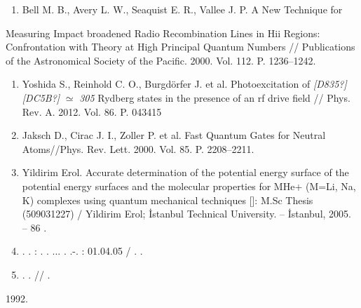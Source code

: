 \documentclass[a4paper]{article}
\newcounter{saveenum}
\newcommand\liststyleWWNumi{%
\renewcommand\theenumi{\arabic{enumi}}
\renewcommand\theenumii{\Roman{enumii}}
\renewcommand\theenumiii{\roman{enumiii}}
\renewcommand\theenumiv{\arabic{enumiv}}
\renewcommand\labelenumi{\theenumi.}
\renewcommand\labelenumii{\theenumii.}
\renewcommand\labelenumiii{\theenumiii.}
\renewcommand\labelenumiv{\theenumiv.}
}
\begin{document}
\begin{enumerate}
\item \foreignlanguage{english}{Bell M. B., Avery L. W., Seaquist E. R., Vallee J. P. A New Technique for}
\end{enumerate}
\foreignlanguage{english}{Measuring Impact broadened Radio Recombination Lines in Hii Regions: Confrontation with Theory
at High Principal Quantum Numbers // Publications of the Astronomical Society of the Pacific. 2000. Vol. 112. P.
1236--1242.}

\liststyleWWNumi
\setcounter{saveenum}{\value{enumi}}
\begin{enumerate}
\setcounter{enumi}{\value{saveenum}}
\item \foreignlanguage{english}{Yoshida S., Reinhold C. O., Burgd\"orfer J. et al. Photoexcitation of }\newline
\foreignlanguage{english}{\textit{[D835?][DC5B?]}}\foreignlanguage{english}{
}\foreignlanguage{english}{\textit{${\simeq}$}}\foreignlanguage{english}{
}\foreignlanguage{english}{\textit{305}}\foreignlanguage{english}{ Rydberg states in the presence of an rf drive field
// Phys. Rev. A. 2012. Vol. 86. P. 043415}
\item \foreignlanguage{english}{Jaksch D., Cirac J. I., Zoller P. et al. Fast Quantum Gates for Neutral Atoms//Phys.
Rev. Lett. 2000. Vol. 85. P. 2208--2211.}
\item \foreignlanguage{english}{Yildirim Erol. Accurate determination of the potential energy surface of the potential
energy surfaces and the molecular properties for MHe+ (M=Li, Na, K) complexes using quantum mechanical techniques
[}{\CYRT}{\cyre}{\cyrk}{\cyrs}{\cyrt}\foreignlanguage{english}{]: M.Sc Thesis (509031227) / Yildirim Erol; \.Istanbul
Technical University. -- \.Istanbul, 2005. -- 86 }{\cyrs}\foreignlanguage{english}{.}
\item {\CYRCH}{\cyre}{\cyrr}{\cyrn}{\cyro}{\cyrv} {\CYRV}. {\CYRE}.
{\CYRV}{\cyrery}{\cyrs}{\cyro}{\cyrk}{\cyro}{\cyrv}{\cyro}{\cyrz}{\cyrb}{\cyru}{\cyrzh}{\cyrd}{\cyryo}{\cyrn}{\cyrn}{\cyrery}{\cyre}
{\cyrerev}{\cyrl}{\cyre}{\cyrk}{\cyrt}{\cyrr}{\cyro}{\cyrn}{\cyrn}{\cyrery}{\cyre}
{\cyrs}{\cyro}{\cyrs}{\cyrt}{\cyro}{\cyrya}{\cyrn}{\cyri}{\cyrya} {\cyrv}
{\cyrm}{\cyra}{\cyrl}{\cyro}{\cyra}{\cyrt}{\cyro}{\cyrm}{\cyrn}{\cyrery}{\cyrh}
{\cyrs}{\cyri}{\cyrs}{\cyrt}{\cyre}{\cyrm}{\cyra}{\cyrh} {\cyrs}
{\cyrn}{\cyre}{\cyrs}{\cyrf}{\cyre}{\cyrr}{\cyri}{\cyrch}{\cyre}{\cyrs}{\cyrk}{\cyro}{\cyrishrt}
{\cyrs}{\cyri}{\cyrm}{\cyrm}{\cyre}{\cyrt}{\cyrr}{\cyri}{\cyre}{\cyrishrt} :
{\cyra}{\cyrv}{\cyrt}{\cyro}{\cyrr}{\cyre}{\cyrf}. {\cyrd}{\cyri}{\cyrs}. ... {\cyrd}{\cyro}{\cyrk}{\cyrt}.
{\cyrf}{\cyri}{\cyrz}.-{\cyrm}{\cyra}{\cyrt}. {\cyrn}{\cyra}{\cyru}{\cyrk} : 01.04.05 / {\CYRV}. {\CYRE}.
{\CYRCH}{\cyre}{\cyrr}{\cyrn}{\cyro}{\cyrv}
\item {\CYRZ}{\cyro}{\cyrn} {\CYRB}. {\CYRA}.
{\CYRR}{\cyri}{\cyrd}{\cyrb}{\cyre}{\cyrr}{\cyrg}{\cyro}{\cyrv}{\cyrs}{\cyrk}{\cyri}{\cyre}
{\cyrs}{\cyro}{\cyrs}{\cyrt}{\cyro}{\cyrya}{\cyrn}{\cyri}{\cyrya} {\cyrv}
{\cyrp}{\cyro}{\cyrl}{\cyrya}{\cyrr}{\cyrn}{\cyrery}{\cyrh}
{\cyrm}{\cyro}{\cyrl}{\cyre}{\cyrk}{\cyru}{\cyrl}{\cyra}{\cyrh} // {\CYRZH}{\CYREREV}{\CYRT}{\CYRF}.
\end{enumerate}
\foreignlanguage{english}{1992. }
\end{document}
